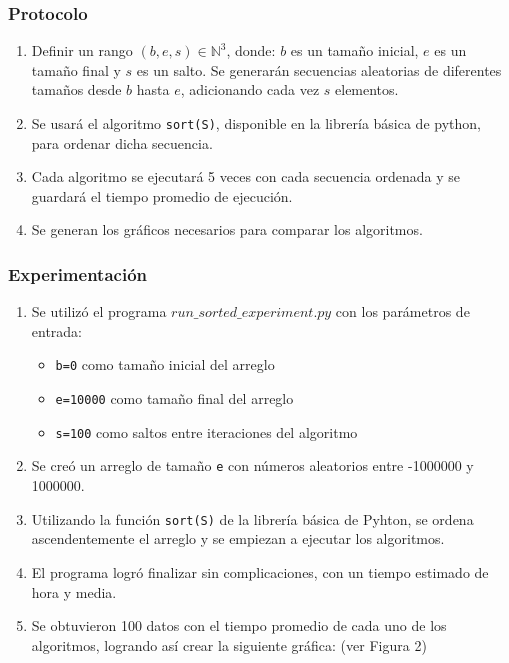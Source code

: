 \documentclass[letter]{article}
\begin{document}
\subsubsection{Protocolo}
\begin{enumerate}
    \item Definir un rango $(b,e,s)\in\mathbb{N}^3$, donde: $b$ es un tamaño inicial, $e$ es un tamaño final y $s$ es un salto. Se generarán secuencias aleatorias de diferentes tamaños desde $b$ hasta $e$, adicionando cada vez $s$ elementos.
    \item Se usará el algoritmo \texttt{sort(S)}, disponible en la librería básica de python, para ordenar dicha secuencia.
    \item Cada algoritmo se ejecutará 5 veces con cada secuencia ordenada y se guardará el tiempo promedio de ejecución.
    \item Se generan los gráficos necesarios para comparar los algoritmos.
\end{enumerate}

\subsubsection{Experimentación}
\begin{enumerate}
    \item Se utilizó el programa \texttt{$run\_sorted\_experiment.py$} con los parámetros de entrada:
    \begin{itemize}
        \item \texttt{b=0} como tamaño inicial del arreglo
        \item \texttt{e=10000} como tamaño final del arreglo
        \item \texttt{s=100} como saltos entre iteraciones del algoritmo
    \end{itemize}
    \item Se creó un arreglo de tamaño \texttt{e} con números aleatorios entre -1000000 y 1000000.
    \item Utilizando la función \texttt{sort(S)} de la librería básica de Pyhton, se ordena ascendentemente el arreglo y se empiezan a ejecutar los algoritmos. 
    \item El programa logró finalizar sin complicaciones, con un tiempo estimado de hora y media.
    \item Se obtuvieron 100 datos con el tiempo promedio de cada uno de los algoritmos, logrando así crear la siguiente gráfica: (ver Figura 2)
\end{enumerate}
\end{document}
